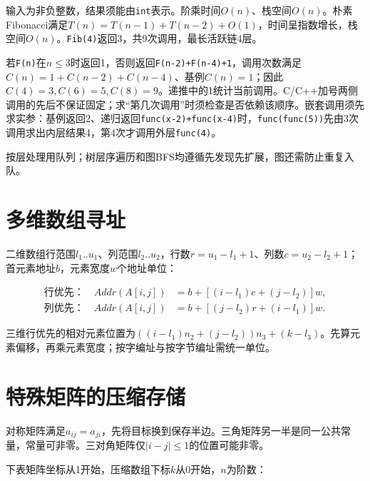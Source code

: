 输入为非负整数，结果须能由\texttt{int}表示。阶乘时间\(O(n)\)、栈空间\(O(n)\)。朴素Fibonacci满足\(T(n)=T(n-1)+T(n-2)+O(1)\)，时间呈指数增长，栈空间\(O(n)\)。\texttt{Fib(\allowbreak{}4)\allowbreak{}}返回3，共9次调用，最长活跃链4层。

若\texttt{F(\allowbreak{}n)\allowbreak{}}在\(n\le3\)时返回1，否则返回\texttt{F(\allowbreak{}n-2)\allowbreak{}+\allowbreak{}F(\allowbreak{}n-4)\allowbreak{}+\allowbreak{}1}，调用次数满足\(C(n)=1+C(n-2)+C(n-4)\)、基例\(C(n)=1\)；因此\(C(4)=3,C(6)=5,C(8)=9\)。递推中的1统计当前调用。C/C++加号两侧调用的先后不保证固定；求``第几次调用''时须检查是否依赖该顺序。嵌套调用须先求实参：基例返回2、递归返回\texttt{func(\allowbreak{}x-2)\allowbreak{}+\allowbreak{}func(\allowbreak{}x-4)\allowbreak{}}时，\texttt{func(\allowbreak{}func(\allowbreak{}5)\allowbreak{})\allowbreak{}}先由3次调用求出内层结果4，第4次才调用外层\texttt{func(\allowbreak{}4)\allowbreak{}}。

按层处理用队列；树层序遍历和图BFS均遵循先发现先扩展，图还需防止重复入队。

\section{多维数组寻址}\label{DS03-array}

二维数组行范围\(l_1..u_1\)、列范围\(l_2..u_2\)，行数\(r=u_1-l_1+1\)、列数\(c=u_2-l_2+1\)；首元素地址\(b\)，元素宽度\(w\)个地址单位：

\[\begin{aligned}
\text{行优先：}\quad Addr(A[i,j])&=b+[(i-l_1)c+(j-l_2)]w,\\
\text{列优先：}\quad Addr(A[i,j])&=b+[(j-l_2)r+(i-l_1)]w.
\end{aligned}\]

三维行优先的相对元素位置为\(((i-l_1)n_2+(j-l_2))n_3+(k-l_3)\)。先算元素偏移，再乘元素宽度；按字编址与按字节编址需统一单位。

\section{特殊矩阵的压缩存储}\label{DS03-matrix}

对称矩阵满足\(a_{ij}=a_{ji}\)，先将目标换到保存半边。三角矩阵另一半是同一公共常量，常量可非零。三对角矩阵仅\(|i-j|\le1\)的位置可能非零。

下表矩阵坐标从1开始，压缩数组下标\(k\)从0开始，\(n\)为阶数：

